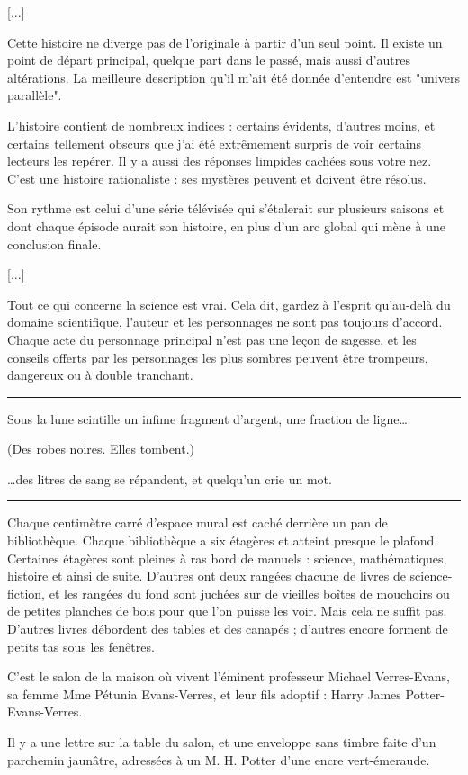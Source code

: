 [...]

Cette histoire ne diverge pas de l'originale à partir d'un seul point. Il existe un point de départ principal, quelque part dans le passé, mais aussi d'autres altérations. La meilleure description qu'il m'ait été donnée d'entendre est "univers parallèle".

L'histoire contient de nombreux indices : certains évidents, d'autres moins, et certains tellement obscurs que j'ai été extrêmement surpris de voir certains lecteurs les repérer. Il y a aussi des réponses limpides cachées sous votre nez. C'est une histoire rationaliste : ses mystères peuvent et doivent être résolus.

Son rythme est celui d'une série télévisée qui s'étalerait sur plusieurs saisons et dont chaque épisode aurait son histoire, en plus d'un arc global qui mène à une conclusion finale.

[...]

Tout ce qui concerne la science est vrai. Cela dit, gardez à l'esprit qu'au-delà du domaine scientifique, l'auteur et les personnages ne sont pas toujours d'accord. Chaque acte du personnage principal n'est pas une leçon de sagesse, et les conseils offerts par les personnages les plus sombres peuvent être trompeurs, dangereux ou à double tranchant.
\par\noindent\rule{\textwidth}{0.4pt}
Sous la lune scintille un infime fragment d'argent, une fraction de ligne…

(Des robes noires. Elles tombent.)

…des litres de sang se répandent, et quelqu'un crie un mot.
\par\noindent\rule{\textwidth}{0.4pt}
Chaque centimètre carré d'espace mural est caché derrière un pan de bibliothèque. Chaque bibliothèque a six étagères et atteint presque le plafond. Certaines étagères sont pleines à ras bord de manuels : science, mathématiques, histoire et ainsi de suite. D'autres ont deux rangées chacune de livres de science-fiction, et les rangées du fond sont juchées sur de vieilles boîtes de mouchoirs ou de petites planches de bois pour que l'on puisse les voir. Mais cela ne suffit pas. D'autres livres débordent des tables et des canapés ; d'autres encore forment de petits tas sous les fenêtres.

C'est le salon de la maison où vivent l'éminent professeur Michael Verres-Evans, sa femme Mme Pétunia Evans-Verres, et leur fils adoptif : Harry James Potter-Evans-Verres.

Il y a une lettre sur la table du salon, et une enveloppe sans timbre faite d'un parchemin jaunâtre, adressées à un M. H. Potter d'une encre vert-émeraude.

